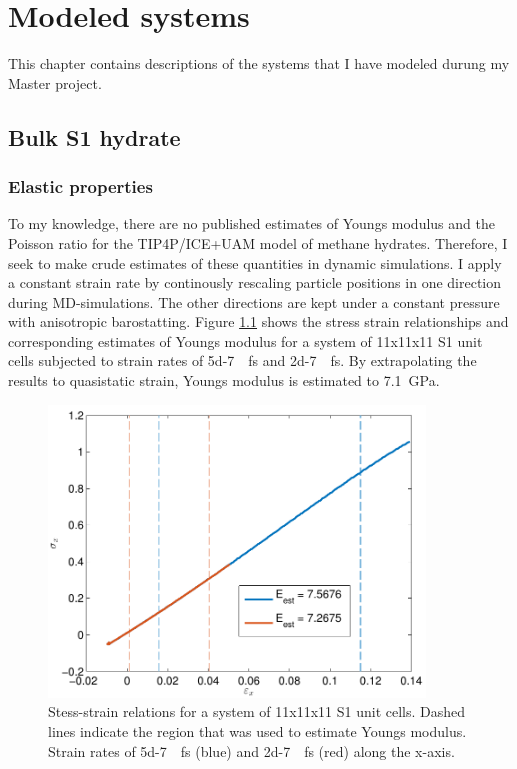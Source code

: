 
\chapter{Modeled systems}
This chapter contains descriptions of the systems that I have modeled durung my Master project. 
\section{Bulk S1 hydrate}
\subsection{Elastic properties}
To my knowledge, there are no published estimates of Youngs modulus and the Poisson ratio for the TIP4P/ICE+UAM model of methane hydrates. Therefore, I seek to make crude estimates of these quantities in dynamic simulations. I apply a constant strain rate by continously rescaling particle positions in one direction during MD-simulations. The other directions are kept under a constant pressure with anisotropic barostatting. Figure \ref{fig:stress_strain_11_11_11_tip4p_ice_uam} shows the stress strain relationships and corresponding estimates of Youngs modulus for a system of 11x11x11 S1 unit cells subjected to strain rates of \SI{5d-7}{\per\femto\second} and \SI{2d-7}{\per\femto\second}. By extrapolating the results to quasistatic strain, Youngs modulus is estimated to \SI{7.1}{\giga\pascal}.

\begin{figure}
\includegraphics[width=10cm]{../figures/thesis/stress_strain_11_11_11_tip4p_ice_uam.pdf}
\caption{Stess-strain relations for a system of 11x11x11 S1 unit cells. Dashed lines indicate the region that was used to estimate Youngs modulus. Strain rates of \SI{5d-7}{\per\femto\second} (blue) and \SI{2d-7}{\per\femto\second} (red) along the x-axis.}
\label{fig:stress_strain_11_11_11_tip4p_ice_uam}
\end{figure}

